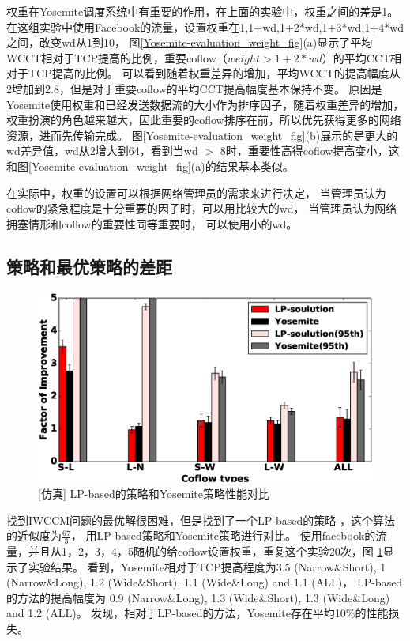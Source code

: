权重在Yosemite调度系统中有重要的作用，在上面的实验中，权重之间的差是1。
在这组实验中使用Facebook的流量，设置权重在1,1+wd,1+2*wd,1+3*wd,1+4*wd之间，改变wd从1到10，
图\ref{Yosemite-evaluation_weight_fig}(a)显示了平均WCCT相对于TCP提高的比例，重要coflow（$weight> 1+2*wd$）的平均CCT相对于TCP提高的比例。
可以看到随着权重差异的增加，平均WCCT的提高幅度从2增加到2.8，但是对于重要coflow的平均CCT提高幅度基本保持不变。
原因是Yosemite使用权重和已经发送数据流的大小作为排序因子，随着权重差异的增加，权重扮演的角色越来越大，因此重要的coflow排序在前，所以优先获得更多的网络资源，进而先传输完成。
图\ref{Yosemite-evaluation_weight_fig}(b)展示的是更大的wd差异值，wd从2增大到64，看到当wd $>$ 8时，重要性高得coflow提高变小，这和图\ref{Yosemite-evaluation_weight_fig}(a)的结果基本类似。

在实际中，权重的设置可以根据网络管理员的需求来进行决定，
当管理员认为coflow的紧急程度是十分重要的因子时，可以用比较大的wd，
当管理员认为网络拥塞情形和coflow的重要性同等重要时，
可以使用小的wd。



\subsection{策略和最优策略的差距}
\begin{figure}[b]
\begin{center}
\includegraphics [width=0.8\columnwidth] {figures/Yosemite/figs/fake/fake1.eps}
\caption{[仿真] LP-based的策略和Yosemite策略性能对比}
\label{Yosemite-LP-based-fig}
\end{center}
\end{figure}
找到IWCCM问题的最优解很困难，但是找到了一个LP-based的策略\cite{qiu2015minimizing} ，这个算法的近似度为$\frac{67}{3}$，
用LP-based策略和Yosemite策略进行对比。
使用facebook的流量，并且从1，2，3，4，5随机的给coflow设置权重，重复这个实验20次，图 \ref{Yosemite-LP-based-fig}显示了实验结果。
看到，Yosemite相对于TCP提高程度为3.5 (Narrow\&Short), 1 (Narrow\&Long), 1.2 (Wide\&Short), 1.1 (Wide\&Long) and 1.1 (ALL)，
LP-based的方法的提高幅度为 0.9 (Narrow\&Long), 1.3 (Wide\&Short), 1.3 (Wide\&Long) and 1.2 (ALL)。
发现，相对于LP-based的方法，Yosemite存在平均10\%的性能损失。


